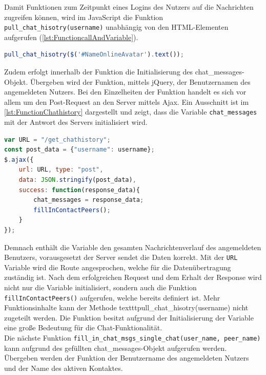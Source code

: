 \documentclass[a4paper,titlepage,halfparskip,12pt]{scrreprt}
\begin{document}
\begin{onehalfspacing}
\pagebreak

Damit Funktionen zum Zeitpunkt eines Logins des Nutzers auf die Nachrichten zugreifen können, wird im JavaScript die Funktion \texttt{pull\_chat\_hisotry(username)} unabhängig von den \ac{HTML}-Elementen aufgerufen (\autoref{lst:FunctioncallAndVariable}).
\begin{lstlisting}[language=Javascript,caption=Aufruf der Funktion \texttt{pull\_chat\_hisotry(username)},label={lst:FunctioncallAndVariable}]
pull_chat_hisotry($('#NameOnlineAvatar').text());
\end{lstlisting}
Zudem erfolgt innerhalb der Funktion die Initialisierung des chat\_messages-Objekt. Übergeben wird der Funktion, mittels jQuery, der Benutzernamen des angemeldeten Nutzers.
Bei den Einzelheiten der Funktion handelt es sich vor allem um den Post-Request an den Server mittels Ajax. Ein Ausschnitt ist im \autoref{lst:FunctionChathistory} dargestellt und zeigt, dass die Variable \texttt{chat\_messages} mit der Antwort des Servers initialisiert wird.
\begin{lstlisting}[language=Javascript,caption=Ausschnitt aus der Funktion \textit{pull\_chat\_hisotry(username)} ,label={lst:FunctionChathistory}]
var URL = "/get_chathistory";
const post_data = {"username": username};
$.ajax({
	url: URL, type: "post",
	data: JSON.stringify(post_data),
	success: function(response_data){
		chat_messages = response_data;
		fillInContactPeers();
	}
});
\end{lstlisting}
Demnach enthält die Variable den gesamten Nachrichtenverlauf des angemeldeten Benutzers, vorausgesetzt der Server sendet die Daten korrekt. Mit der \texttt{URL} Variable wird die Route angesprochen, welche für die Datenübertragung zuständig ist. Nach dem erfolgreichen Request und dem Erhalt der Response wird nicht nur die Variable initialisiert, sondern auch die Funktion \texttt{fillInContactPeers()} aufgerufen, welche bereits definiert ist. Mehr Funktionsinhalte kann der Methode texttt{pull\_chat\_hisotry(username)} nicht zugeteilt werden. Die Funktion besitzt aufgrund der Initialisierung der Variable eine große Bedeutung für die Chat-Funktionalität.\\
Die nächste Funktion \texttt{fill\_in\_chat\_msgs\_single\_chat(user\_name, peer\_name)} kann aufgrund des gefüllten chat\_messages-Objekt aufgerufen werden. Übergeben werden der Funktion der Benutzername des angemeldeten Nutzers und der Name des aktiven Kontaktes. 
\begin{lstlisting}[language=Javascript,caption=Ausschnitt aus der Funktion \texttt{pull\_chat\_hisotry(username)} ,label={lst:FunctionFillInChat}]

\end{lstlisting}
\end{onehalfspacing}
\end{document}
